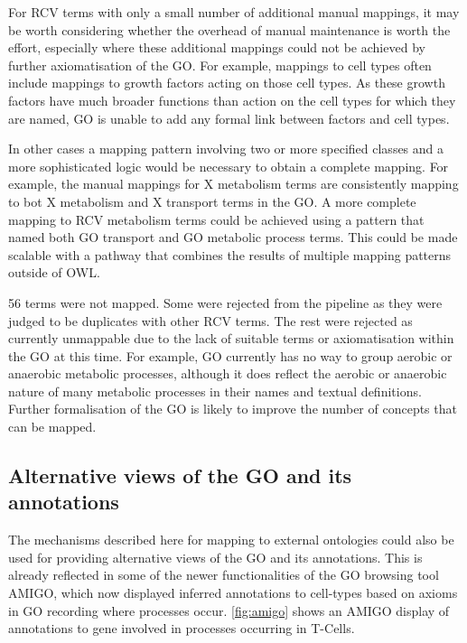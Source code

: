 \documentclass[runningheads,a4paper]{llncs}
\begin{document}
{{For RCV terms with only a small number of additional manual mappings, it may be worth considering whether the overhead of manual maintenance is worth the effort, especially where these additional mappings could not be achieved by further axiomatisation of the \ac{GO}.  For example, mappings to cell types often include mappings to growth factors acting on those cell types.  As these growth factors have much broader functions than action on the cell types for which they are named, \ac{GO} is unable to add any formal link between factors and cell types.

In other cases a mapping pattern involving two or more specified classes and a more sophisticated logic would be necessary to obtain a complete mapping.  For example, the manual mappings for X metabolism terms are consistently mapping to bot X metabolism and X transport terms in the \ac{GO}. A more complete mapping to RCV metabolism terms could be achieved using a pattern that named both \ac{GO} transport and \ac{GO} metabolic process terms.  This could be made scalable with a pathway that combines the results of multiple mapping patterns outside of OWL.

56 terms were not mapped.  Some were rejected from the pipeline as they were judged to be duplicates with other RCV terms.  The rest were rejected as currently unmappable due to the lack of suitable terms or axiomatisation within the \ac{GO} at this time.  For example, \ac{GO} currently has no way to group aerobic or anaerobic metabolic processes, although it does reflect the aerobic or anaerobic nature of many metabolic processes in their names and textual definitions. Further formalisation of the \ac{GO} is likely to improve the number of concepts that can be mapped.

\subsection{Alternative views of the \ac{GO} and its annotations}

The mechanisms described here for mapping to external ontologies could also be used for providing alternative views of the \ac{GO} and its annotations.  This is already reflected in some of the newer functionalities of the \ac{GO} browsing tool AMIGO, which now displayed inferred annotations to cell-types based on axioms in \ac{GO} recording where processes occur.  \ref{fig:amigo} shows an AMIGO display of annotations to gene involved in processes occurring in T-Cells.


}}
\end{document}
